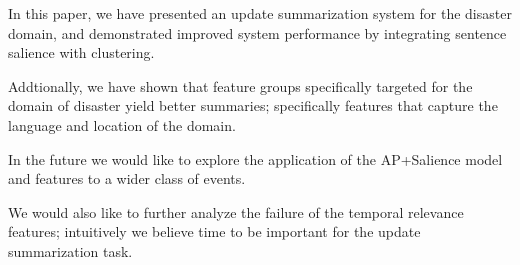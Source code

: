 In this paper, we have presented an update summarization system for the disaster domain,
and demonstrated improved system performance by integrating sentence salience with clustering.

Addtionally, we have shown that feature groups specifically targeted for the domain of disaster yield
better summaries; specifically features that capture the language and location
of the domain.


In the future we would like to explore the application of the AP+Salience
 model and features
to a wider class of events. 

We would also like to further analyze the failure 
of the temporal relevance features; intuitively we believe time to be important
for the update summarization task.

